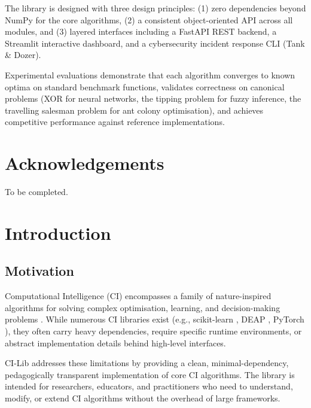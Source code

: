 \documentclass[12pt,a4paper,twoside]{report}
\begin{document}
The library is designed with three design principles:
(1) zero dependencies beyond NumPy for the core algorithms,
(2) a consistent object-oriented API across all modules, and
(3) layered interfaces including a FastAPI REST backend, a Streamlit
interactive dashboard, and a cybersecurity incident response CLI (Tank \& Dozer).

Experimental evaluations demonstrate that each algorithm converges to known
optima on standard benchmark functions, validates correctness on canonical
problems (XOR for neural networks, the tipping problem for fuzzy inference,
the travelling salesman problem for ant colony optimisation), and achieves
competitive performance against reference implementations.

\chapter*{Acknowledgements}
To be completed.

\tableofcontents
\listoffigures
\listoftables


\chapter{Introduction}
\label{chap:introduction}

\section{Motivation}
Computational Intelligence (CI) encompasses a family of nature-inspired
algorithms for solving complex optimisation, learning, and decision-making
problems \citep{engelbrecht2007computational}. While numerous CI libraries
exist (e.g., scikit-learn \citep{scikit-learn}, DEAP \citep{deap}, PyTorch
\citep{pytorch}), they often carry heavy dependencies, require specific
runtime environments, or abstract implementation details behind high-level
interfaces.

CI-Lib addresses these limitations by providing a clean, minimal-dependency,
pedagogically transparent implementation of core CI algorithms. The library
is intended for researchers, educators, and practitioners who need to
understand, modify, or extend CI algorithms without the overhead of large
frameworks.
\end{document}
